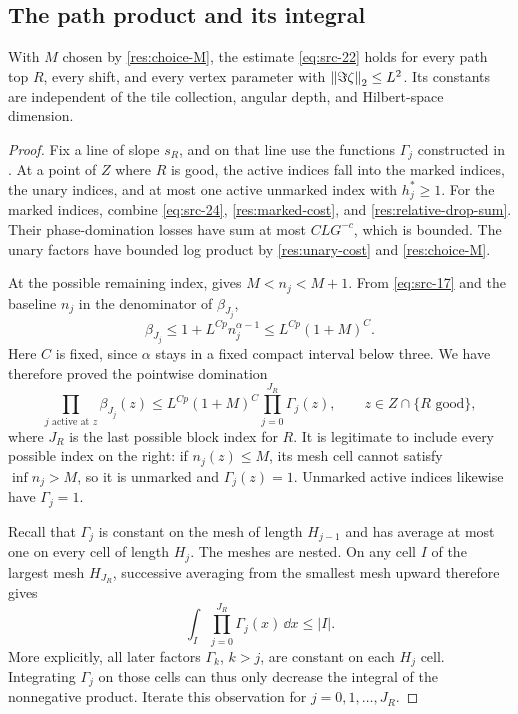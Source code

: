 \subsection{The path product and its integral}

\begin{theorem}
\label{res:path-product}
With $M$ chosen by \eqref{res:choice-M}, the estimate
\eqref{eq:src-22} holds for every path top $R$, every shift, and
every vertex parameter with $\left\|\Im\zeta\right\|_2\le L^2$.
Its constants are independent of the tile collection, angular
depth, and Hilbert-space dimension.
\end{theorem}

\begin{proof}
Fix a line of slope $s_R$, and on that line use the functions
$\Gamma_j$ constructed in .
At a point of $Z$ where $R$ is good, the active indices fall into
the marked indices, the unary indices, and at most one active
unmarked index with $h_j^*\ge1$.
For the marked indices, combine \eqref{eq:src-24},
\eqref{res:marked-cost}, and
\eqref{res:relative-drop-sum}.  Their phase-domination losses have
sum at most $CLG^{-c}$, which is bounded.  The unary factors have
bounded log product by \eqref{res:unary-cost} and
\eqref{res:choice-M}.

At the possible remaining index,  gives
$M<n_j<M+1$.  From \eqref{eq:src-17} and the baseline $n_j$ in
the denominator of $\beta_{J_j}$,
\[
  \beta_{J_j}\le 1+L^{Cp}n_j^{\alpha-1}
       \le L^{Cp}(1+M)^C.
\]
Here $C$ is fixed, since $\alpha$ stays in a fixed compact interval
below three.  We have therefore proved the pointwise domination
\begin{equation}
 \prod_{j\text{ active at }z}\beta_{J_j}(z)
       \le L^{Cp}(1+M)^C\prod_{j=0}^{J_R}\Gamma_j(z),
 \qquad z\in Z\cap\{R\text{ good}\},
 \label{res:pointwise-product}
\end{equation}
where $J_R$ is the last possible block index for $R$.
It is legitimate to include every possible index on the right:
if $n_j(z)\le M$, its mesh cell cannot satisfy
$\inf n_j>M$, so it is unmarked and $\Gamma_j(z)=1$.
Unmarked active indices likewise have $\Gamma_j=1$.

Recall that $\Gamma_j$ is constant on the mesh of length $H_{j-1}$
and has average at most one on every cell of length $H_j$.
The meshes are nested.  On any cell $I$ of the largest mesh
$H_{J_R}$, successive averaging from the smallest mesh upward
therefore gives
\begin{equation}
  \int_I\prod_{j=0}^{J_R}\Gamma_j(x)\,\dd x\le |I|.
  \label{res:mesh-average}
\end{equation}
More explicitly, all later factors $\Gamma_k$, $k>j$, are constant
on each $H_j$ cell.  Integrating $\Gamma_j$ on those cells can thus
only decrease the integral of the nonnegative product.  Iterate
this observation for $j=0,1,\ldots,J_R$.


\end{proof}
